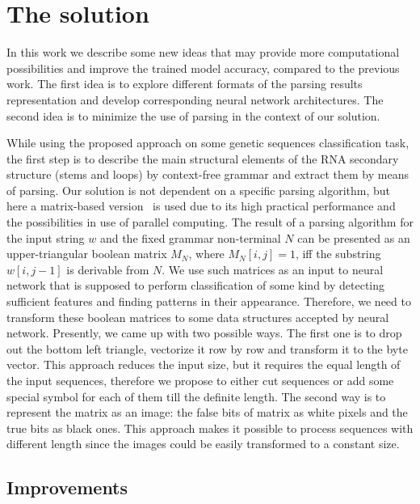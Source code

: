 \documentclass[12pt,a4paper]{cibb}
\begin{document}
\section{\bf The solution}

In this work we describe some new ideas that may provide more computational possibilities and improve the trained model accuracy, compared to the previous work.
The first idea is to explore different formats of the parsing results representation and develop corresponding neural network architectures. The second idea is to minimize the use of parsing in the context of our solution.

While using the proposed approach on some genetic sequences classification task, the first step is to describe the main structural elements of the RNA secondary structure (stems and loops) by context-free grammar and extract them by means of parsing.
Our solution is not dependent on a specific parsing algorithm, but here a matrix-based version~\cite{Azimov:2018:CPQ:3210259.3210264} is used due to its high practical performance and the possibilities in use of parallel computing.
The result of a parsing algorithm for the input string $w$ and the fixed grammar non-terminal $N$ can be presented as an upper-triangular boolean matrix $M_N$, where $M_N [i,j] = 1$, iff the substring $w[i,j-1]$ is derivable from $N$.
We use such matrices as an input to neural network that is supposed to perform classification of some kind by detecting sufficient features and finding patterns in their appearance.
Therefore, we need to transform these boolean matrices to some data structures accepted by neural network.
Presently, we came up with two possible ways.
The first one is to drop out the bottom left triangle, vectorize it row by row and transform it to the byte vector.
This approach reduces the input size, but it requires the equal length of the input sequences, therefore we propose to either cut sequences or add some special symbol for each of them till the definite length.
The second way is to represent the matrix as an image: the false bits of matrix as white pixels and the true bits as black ones.
This approach makes it possible to process sequences with different length since the images could be easily transformed to a constant size.

\subsection{Improvements}
\end{document}
